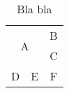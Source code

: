 \documentclass{article}
\begin{document}
\begin{table}
	\centering
	\begin{tabular}{ccc}
		\multicolumn{2}{c}{\multirow[t]{2}{*}[-.77ex]{\Large{A}}} & B \\
		  &                                                       & C \\
		D & E                                                     & F \\
	\end{tabular}
	\caption{Bla bla}
\end{table}
\end{document}
